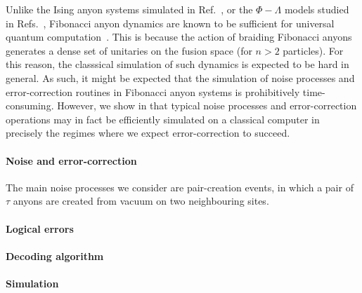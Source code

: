 \documentclass[aps, prl, letterpaper, twocolumn, superscriptaddress, notitlepage]{revtex4-1}
\begin{document}
	Unlike the Ising anyon systems simulated in Ref.~\cite{Brell2013}, or the $\Phi-\Lambda$ models studied in Refs.~\cite{Wootton2013, Hutter2014}, Fibonacci anyon dynamics are known to be sufficient for universal quantum computation~\cite{Freedman2002}. This is because the action of braiding Fibonacci anyons generates a dense set of unitaries on the fusion space (for $n>2$ particles). For this reason, the classsical simulation of such dynamics is expected to be hard in general. As such, it might be expected that the simulation of noise processes and error-correction routines in Fibonacci anyon systems is prohibitively time-consuming. However, we show in  that typical noise processes and error-correction operations may in fact be efficiently simulated on a classical computer in precisely the regimes where we expect error-correction to succeed.
	


\paragraph{Noise and error-correction}\label{s:noise}

	The main noise processes we consider are pair-creation events, in which a pair of $\tau$ anyons are created from vacuum on two neighbouring sites.
	

	\paragraph{Logical errors}
		

	\paragraph{Decoding algorithm}
	

	
	
\paragraph{Simulation}\label{s:sim}
\end{document}
